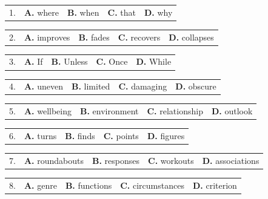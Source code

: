 \documentclass[UTF8,11pt]{ctexart}
\begin{document}
\noindent\begin{tabularx}{\linewidth}{@{}lXXXX@{}}1. & \textbf{A.} where & \textbf{B.} when & \textbf{C.} that & \textbf{D.} why\\\end{tabularx}\par

\noindent\begin{tabularx}{\linewidth}{@{}lXXXX@{}}2. & \textbf{A.} improves & \textbf{B.} fades & \textbf{C.} recovers & \textbf{D.} collapses\\\end{tabularx}\par

\noindent\begin{tabularx}{\linewidth}{@{}lXXXX@{}}3. & \textbf{A.} If & \textbf{B.} Unless & \textbf{C.} Once & \textbf{D.} While\\\end{tabularx}\par

\noindent\begin{tabularx}{\linewidth}{@{}lXXXX@{}}4. & \textbf{A.} uneven & \textbf{B.} limited & \textbf{C.} damaging & \textbf{D.} obscure\\\end{tabularx}\par

\noindent\begin{tabularx}{\linewidth}{@{}lXXXX@{}}5. & \textbf{A.} wellbeing & \textbf{B.} environment & \textbf{C.} relationship & \textbf{D.} outlook\\\end{tabularx}\par

\noindent\begin{tabularx}{\linewidth}{@{}lXXXX@{}}6. & \textbf{A.} turns & \textbf{B.} finds & \textbf{C.} points & \textbf{D.} figures\\\end{tabularx}\par

\noindent\begin{tabularx}{\linewidth}{@{}lXXXX@{}}7. & \textbf{A.} roundabouts & \textbf{B.} responses & \textbf{C.} workouts & \textbf{D.} associations\\\end{tabularx}\par

\noindent\begin{tabularx}{\linewidth}{@{}lXXXX@{}}8. & \textbf{A.} genre & \textbf{B.} functions & \textbf{C.} circumstances & \textbf{D.} criterion\\\end{tabularx}\par
\end{document}

